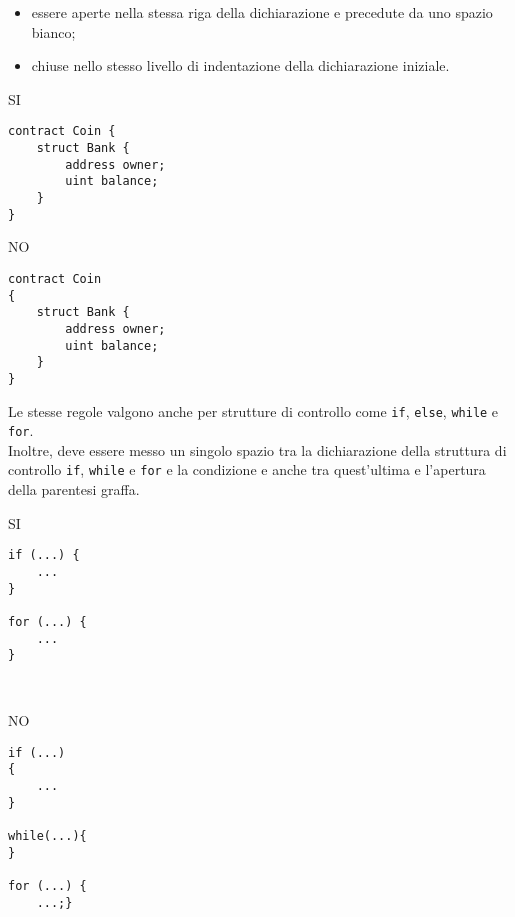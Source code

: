 \documentclass[../ProcessiPrimari.tex]{subfiles}
\begin{document}
\begin{itemize}
\item essere aperte nella stessa riga della dichiarazione e precedute da uno spazio bianco;
\item chiuse nello stesso livello di indentazione della dichiarazione iniziale.
\end{itemize}
\begin{center}{
\begin{minipage}{5.5cm}
{\begin{center}SI\end{center}}
\begin{Verbatim}[frame=single]
contract Coin {
    struct Bank {
        address owner;
        uint balance;
    }
}

\end{Verbatim}
\end{minipage}
\hfil
\begin{minipage}{5.5cm}
{\begin{center}NO\end{center}}
\begin{Verbatim}[frame=single]
contract Coin
{
    struct Bank {
        address owner;
        uint balance;
    }
}
\end{Verbatim}
\end{minipage}
}
\end{center}
Le stesse regole valgono anche per strutture di controllo come \texttt{if}, \texttt{else}, \texttt{while} e \texttt{for}.\\
Inoltre, deve essere messo un singolo spazio tra la dichiarazione della struttura di controllo \texttt{if}, \texttt{while} e \texttt{for} e la condizione e anche tra quest'ultima e l'apertura della parentesi graffa.
\begin{center}{
\begin{minipage}{6cm}
{\begin{center}SI\end{center}}
\begin{Verbatim}[frame=single]
if (...) {
    ...
}

for (...) {
    ...
}



\end{Verbatim}
\end{minipage}
\hfil
\begin{minipage}{6cm}
{\begin{center}NO\end{center}}
\begin{Verbatim}[frame=single]
if (...)
{
    ...
}

while(...){
}

for (...) {
    ...;}
\end{Verbatim}
\end{minipage}
}
\end{center}
\end{document}
